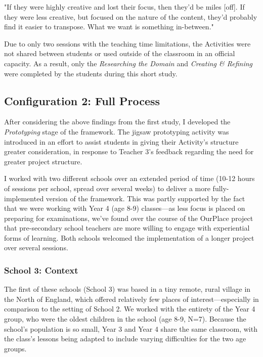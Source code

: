 \begin{displayquote}
"If they were highly creative and lost their focus, then they'd be miles [off]. If they were less creative, but focused on the nature of the content, they'd probably find it easier to transpose. What we want is something in-between."
\end{displayquote}

Due to only two sessions with the teaching time limitations, the Activities were not shared between students or used outside of the classroom in an official capacity. As a result, only the \textit{Researching the Domain} and \textit{Creating \& Refining} were completed by the students during this short study.

\subsection{Configuration 2: Full Process}

After considering the above findings from the first study, I developed the \textit{Prototyping} stage of the framework. The jigsaw prototyping activity was introduced in an effort to assist students in giving their Activity's structure greater consideration, in response to Teacher 3's feedback regarding the need for greater project structure.

I worked with two different schools over an extended period of time (10-12 hours of sessions per school, spread over several weeks) to deliver a more fully-implemented version of the framework. This was partly supported by the fact that we were working with Year 4 (age 8-9) classes---as less focus is placed on preparing for examinations, we've found over the course of the OurPlace project that pre-secondary school teachers are more willing to engage with experiential forms of learning. Both schools welcomed the implementation of a longer project over several sessions.

\subsubsection{School 3: Context}

The first of these schools (School 3) was based in a tiny remote, rural village in the North of England, which offered relatively few places of interest---especially in comparison to the setting of School 2. We worked with the entirety of the Year 4 group, who were the oldest children in the school (age 8-9, N=7). Because the school's population is so small, Year 3 and Year 4 share the same classroom, with the class's lessons being adapted to include varying difficulties for the two age groups. 

